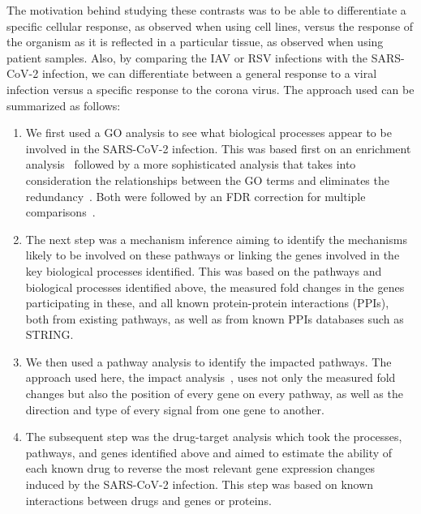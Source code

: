 The motivation behind studying these contrasts was to be able to differentiate a specific cellular response, as  observed when using cell lines, versus the response of the organism as it is reflected in a particular tissue, as observed when using  patient samples. Also, by comparing the IAV or RSV infections with the SARS-CoV-2 infection, we can differentiate between a general response to a viral infection versus a specific response to the  corona virus. 
The approach used can be summarized as follows: 
\begin{enumerate}
\item We first used a GO analysis to see what biological processes appear to be involved in the SARS-CoV-2 infection. This was based first on an enrichment analysis~\cite{Tavazoie:1999,DraghiciOE2:2003} followed by a more sophisticated analysis that takes into consideration the relationships between the GO terms and eliminates the redundancy~\cite{Alexa:2006}. Both were followed by an FDR correction for multiple comparisons~\cite{Benjamini:1995,Benjamini:2001}. 
\item The next step was a mechanism inference  aiming to identify the mechanisms likely to be involved on these pathways or linking the genes involved in the key biological processes identified. This was based on the pathways and biological processes identified above, the measured fold changes in the genes participating in these, and all known protein-protein interactions (PPIs), both from existing pathways, as well as from known PPIs databases such as STRING.
\item We then  used a pathway analysis to identify the impacted pathways. The approach used here, the impact analysis~\cite{DraghiciPE:2007,TarcaSPIA:2009}, uses not only the measured fold changes but also the position of every gene on every pathway, as well as the direction and type of every signal from one gene to another. 
\item The subsequent step was the drug-target analysis which took the processes, pathways, and genes identified above and  aimed to estimate the ability of each known drug to reverse the most relevant gene expression changes induced by the SARS-CoV-2 infection. This step was based on known interactions between drugs and genes or proteins.
\end{enumerate}

